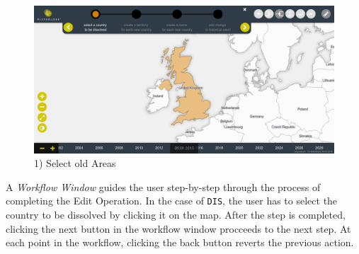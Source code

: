 \vspace{1em}
\begin{minipage}[t]{0.47\textwidth}

  \begin{figure}[H]
    \centering
    \includegraphics[width=1.0\textwidth]{graphics/development/final_interface/3_select_old_areas.png}
    \caption{1) Select old Areas}
    \label{fig:final_3_select_old_areas}
  \end{figure}

  A \emph{Workflow Window} guides the user step-by-step through the process of completing the Edit Operation. In the case of \texttt{DIS}, the user has to select the country to be dissolved by clicking it on the map. After the step is completed, clicking the next button in the workflow window procceeds to the next step. At each point in the workflow, clicking the back button reverts the previous action.

\end{minipage}    %
\hspace{1.5em}    %
